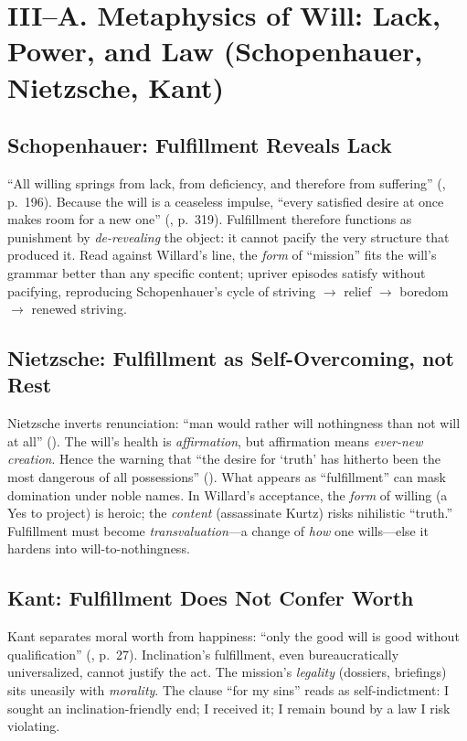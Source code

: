 \section*{III–A. Metaphysics of Will: Lack, Power, and Law (Schopenhauer, Nietzsche, Kant)}

\subsection*{Schopenhauer: Fulfillment Reveals Lack}
“All willing springs from lack, from deficiency, and therefore from suffering” (\parencite{SchopenhauerWWR1969}, p.~196). Because the will is a ceaseless impulse, “every satisfied desire at once makes room for a new one” (\parencite{SchopenhauerWWR1969}, p.~319). Fulfillment therefore functions as punishment by \emph{de-revealing} the object: it cannot pacify the very structure that produced it. Read against Willard’s line, the \emph{form} of “mission” fits the will’s grammar better than any specific content; upriver episodes satisfy without pacifying, reproducing Schopenhauer’s cycle of striving $\rightarrow$ relief $\rightarrow$ boredom $\rightarrow$ renewed striving.

\subsection*{Nietzsche: Fulfillment as Self-Overcoming, not Rest}
Nietzsche inverts renunciation: “man would rather will nothingness than not will at all” (\parencite[III.28, p.~162]{NietzscheGenealogy1994}). The will’s health is \emph{affirmation}, but affirmation means \emph{ever-new creation}. Hence the warning that “the desire for ‘truth’ has hitherto been the most dangerous of all possessions” (\parencite[\S 34]{NietzscheBGE1990}). What appears as “fulfillment” can mask domination under noble names. In Willard’s acceptance, the \emph{form} of willing (a Yes to project) is heroic; the \emph{content} (assassinate Kurtz) risks nihilistic “truth.” Fulfillment must become \emph{transvaluation}—a change of \emph{how} one wills—else it hardens into will-to-nothingness.

\subsection*{Kant: Fulfillment Does Not Confer Worth}
Kant separates moral worth from happiness: “only the good will is good without qualification” (\parencite{KantCPrR1996}, p.~27). Inclination’s fulfillment, even bureaucratically universalized, cannot justify the act. The mission’s \emph{legality} (dossiers, briefings) sits uneasily with \emph{morality}. The clause “for my sins” reads as self-indictment: I sought an inclination-friendly end; I received it; I remain bound by a law I risk violating.


